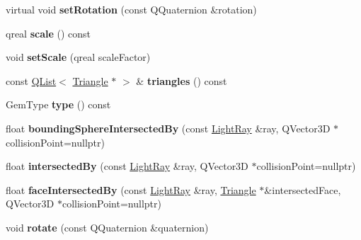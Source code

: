 \begin{DoxyCompactItemize}
\item 
\hypertarget{class_abstract_gem_afce4d09f74fec117d27b11a220eee6b9}{}virtual void {\bfseries set\+Rotation} (const Q\+Quaternion \&rotation)\label{class_abstract_gem_afce4d09f74fec117d27b11a220eee6b9}

\item 
\hypertarget{class_abstract_gem_aadc1c5925331b573d9aba6c2451c9348}{}qreal {\bfseries scale} () const \label{class_abstract_gem_aadc1c5925331b573d9aba6c2451c9348}

\item 
\hypertarget{class_abstract_gem_a23693f4ebb5260cb21141bbcf3f4ff83}{}void {\bfseries set\+Scale} (qreal scale\+Factor)\label{class_abstract_gem_a23693f4ebb5260cb21141bbcf3f4ff83}

\item 
\hypertarget{class_abstract_gem_a52741bbab219af90f8400104f4c55f7a}{}const \hyperlink{class_q_list}{Q\+List}$<$ \hyperlink{class_triangle}{Triangle} $\ast$ $>$ \& {\bfseries triangles} () const \label{class_abstract_gem_a52741bbab219af90f8400104f4c55f7a}

\item 
\hypertarget{class_abstract_gem_a4860dda50d7acab4f507505369da19f8}{}Gem\+Type {\bfseries type} () const \label{class_abstract_gem_a4860dda50d7acab4f507505369da19f8}

\item 
\hypertarget{class_abstract_gem_a9f945c4f1b76ae90414ed3229d01dd0b}{}float {\bfseries bounding\+Sphere\+Intersected\+By} (const \hyperlink{class_light_ray}{Light\+Ray} \&ray, Q\+Vector3\+D $\ast$collision\+Point=nullptr)\label{class_abstract_gem_a9f945c4f1b76ae90414ed3229d01dd0b}

\item 
\hypertarget{class_abstract_gem_adc52cc6d78f3494563c50cfd7e0584b4}{}float {\bfseries intersected\+By} (const \hyperlink{class_light_ray}{Light\+Ray} \&ray, Q\+Vector3\+D $\ast$collision\+Point=nullptr)\label{class_abstract_gem_adc52cc6d78f3494563c50cfd7e0584b4}

\item 
\hypertarget{class_abstract_gem_a446d8e7a7296203789414ae5b93e0bde}{}float {\bfseries face\+Intersected\+By} (const \hyperlink{class_light_ray}{Light\+Ray} \&ray, \hyperlink{class_triangle}{Triangle} $\ast$\&intersected\+Face, Q\+Vector3\+D $\ast$collision\+Point=nullptr)\label{class_abstract_gem_a446d8e7a7296203789414ae5b93e0bde}

\item 
\hypertarget{class_abstract_gem_a5ca6867a835dfe2b49d46dbfb933bfca}{}void {\bfseries rotate} (const Q\+Quaternion \&quaternion)\label{class_abstract_gem_a5ca6867a835dfe2b49d46dbfb933bfca}

\end{DoxyCompactItemize}
